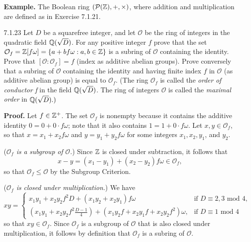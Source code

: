 \begin{enumerate}
      \textbf{Example.} The Boolean ring $(\mathcal{P}(\mathbb{Z}), +, \times)$, where
      addition and multiplication are defined as in Exercise 7.1.21.
   \item[7.1.23]  Let $D$ be a squarefree integer, and let $\mathcal{O}$ be the
                  ring of integers in the quadratic field $\mathbb{Q}(\sqrt{D})$. For 
                  any positive integer $f$ prove that the set
                  $\mathcal{O}_f = \mathbb{Z}[f\omega] = \{a + bf\omega : a, b \in \mathbb{Z}\}$
                  is a subring of $\mathcal{O}$ containing the identity. Prove
                  that $[\mathcal{O} : \mathcal{O}_f] = f$ (index as additive
                  abelian groups). Prove conversely that a subring of
                  $\mathcal{O}$ containing the identity and having finite index
                  $f$ in $\mathcal{O}$ (as additive abelian group) is equal to
                  $\mathcal{O}_f$. (The ring $\mathcal{O}_f$ is called the
                  \textit{order of conductor f} in the field $\mathbb{Q}(\sqrt{D})$. The
                  ring of integers $\mathcal{O}$ is called the
                  \textit{maximal order} in $\mathbb{Q}(\sqrt{D}).)$

      \textbf{Proof.} Let $f \in \mathbb{Z}^+$. The set $\mathcal{O}_f$ is nonempty
      because it contains the additive identity $0 = 0 + 0 \cdot f\omega$; note 
      that it also contains $1 = 1 + 0 \cdot f\omega$. Let
      $x,  y \in \mathcal{O}_f$, so that $x = x_1 + x_2f\omega$ and
      $y = y_1 + y_2f\omega$ for some integers $x_1, x_2, y_1$, and $y_2$.

      (\textit{$\mathcal{O}_f$ is a subgroup of $\mathcal{O}$.})  Since $\mathbb{Z}$ is 
      closed under subtraction, it follows that
      $$x - y = (x_1 - y_1) + (x_2 - y_2)f\omega \in \mathcal{O}_f,$$
      so that  $\mathcal{O}_f \le \mathcal{O}$ by the Subgroup Criterion.

      (\textit{$\mathcal{O}_f$ is closed under multiplication.}) We have
      \begin{equation*}
         xy = \left\{
         \begin{array}{rl}
            x_1y_1 + x_2y_2f^2D + (x_1y_2 + x_2y_1)f\omega & \text{if }
               D \equiv 2, 3 \text{ mod } 4, \\
            \left(x_1y_1 + x_2y_2f^2\frac{D-1}{4}\right) +
               (x_1y_2f + x_2y_1f +x_2y_2f^2)\omega, & \text{if }
               D \equiv 1 \text{ mod } 4
         \end{array} \right.
      \end{equation*}
      so that $xy \in \mathcal{O}_f$. Since $\mathcal{O}_f$ is a subgroup of
      $\mathcal{O}$ that is also closed under multiplication, it follows by 
      definition that $\mathcal{O}_f$ is a subring of $\mathcal{O}$.
      

\end{enumerate}
